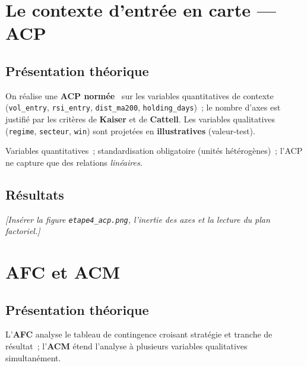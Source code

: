 \section{Le contexte d'entrée en carte --- ACP}
\label{sec:b1-etape4}

\subsection{Présentation théorique}
On réalise une \textbf{ACP normée}~\cite{saporta2006,lebart2006} sur les
variables quantitatives de contexte (\texttt{vol\_entry},
\texttt{rsi\_entry}, \texttt{dist\_ma200},
\texttt{holding\_days})~; le nombre d'axes est justifié par les critères
de \textbf{Kaiser} et de \textbf{Cattell}. Les variables qualitatives
(\texttt{regime}, \texttt{secteur}, \texttt{win}) sont projetées en
\textbf{illustratives} (valeur-test).

\begin{conditions}
Variables quantitatives~; standardisation obligatoire (unités
hétérogènes)~; l'ACP ne capture que des relations \emph{linéaires}.
\end{conditions}

\subsection{Résultats}
\emph{[Insérer la figure \texttt{etape4\_acp.png}, l'inertie des axes et
la lecture du plan factoriel.]}

\section{AFC et ACM}
\label{sec:b1-etape56}

\subsection{Présentation théorique}
L'\textbf{AFC} analyse le tableau de contingence croisant stratégie et
tranche de résultat~; l'\textbf{ACM} étend l'analyse à plusieurs
variables qualitatives simultanément.

